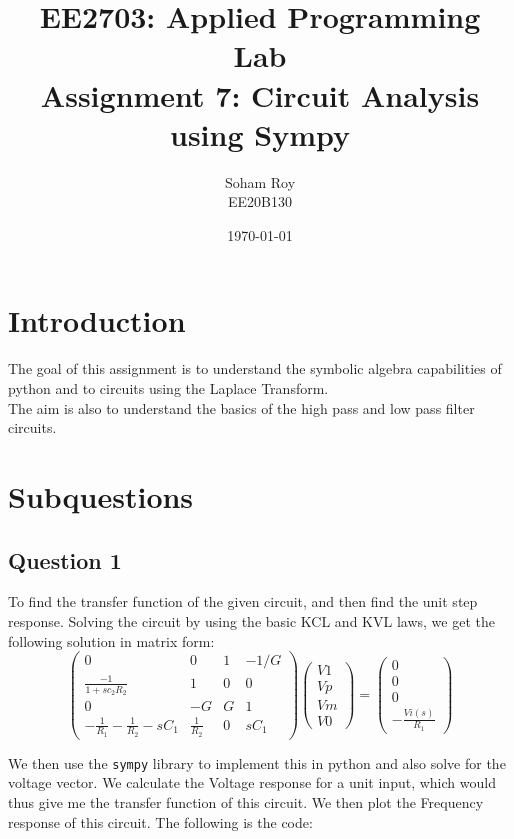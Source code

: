 \documentclass[12pt, a4paper]{article}
\title{EE2703: Applied Programming Lab \\ \Large Assignment 7: Circuit Analysis using Sympy}
\author{Soham Roy \\ \normalsize EE20B130}
\date{\today}
\newcommand{\code}{\lstinline[basicstyle=\small]}
\begin{document}
\maketitle %



\section{Introduction}
The goal of this assignment is to understand the symbolic algebra capabilities of python and to circuits using
the Laplace Transform. \\
The aim is also to understand the basics of the high pass and low pass filter circuits.



\section{Subquestions}
\subsection{Question 1}
To find the transfer function of the given circuit, and then find the unit step response.
Solving the circuit by using the basic KCL and KVL laws, we get the following solution in matrix form:
\[
    \begin{pmatrix}
        0                                    & 0             & 1 & -1/G \\
        \frac{-1}{1+sc_2R_2}                 & 1             & 0 & 0    \\
        0                                    & -G            & G & 1    \\
        -\frac{1}{R_1} -\frac{1}{R_2} - sC_1 & \frac{1}{R_2} & 0 & sC_1
    \end{pmatrix}
    \begin{pmatrix}
        V1 \\
        Vp \\
        Vm \\
        V0
    \end{pmatrix}
    =
    \begin{pmatrix}
        0 \\
        0 \\
        0 \\
        -\frac{Vi(s)}{R_1}
    \end{pmatrix}
\]

We then use the \code{sympy} library to implement this in python and also solve for the voltage vector.
We calculate the Voltage response for a unit input, which would thus give me the transfer function of this circuit.
We then plot the Frequency response of this circuit. The following is the code:
\end{document}
